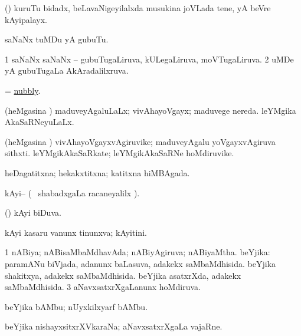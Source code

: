 \bentry
{}
\gl{\nA}
\bmng
(\ame) kuruTu bidadx, beLavaNigeyilalxda musukina joVLada tene, yA beVre kAyipalayx. 
\emng
\eentry

\bentry
{}
\gl{\nA}
\bmng
saNaNx tuMDu yA gubuTu. 
\emng
\eentry

\bentry
{}
\gl{\gu}
\bmng
\bnum
\num{1} saNaNx saNaNx -- gubuTugaLiruva, kULegaLiruva, moVTugaLiruva. 
\num{2} uMDe yA gubuTugaLa AkAradalilxruva. 
\enum
\emng
\eentry

\bentry
{}
\gl{\gu}
\bmng
= \hyperlink{nubbly}{nubbly}. 
\emng
\eentry

\bentry
{}
\gl{\gu}
\bmng
(heMgasina \vi) 
\banum
{} maduveyAgaluLaLx; vivAhayoVgayx; maduvege nereda. 
 leYMgika AkaSaRNeyuLaLx. 
\eanum
\emng
\eentry

\bentry
{}
\gl{\nA}
\bmng
(heMgasina \vi) 
\banum
{} vivAhayoVgayxvAgiruvike; maduveyAgalu yoVgayxvAgiruva sithxti. 
 leYMgikAkaSaRkate; leYMgikAkaSaRNe hoMdiruvike. 
\eanum
\emng
\eentry

\bentry
{}
\gl{\gu}
\bmng
heDagatitxna; hekakxtitxna; katitxna hiMBAgada. 
\emng
\eentry

\bentry
{}
\gl{\sapUpa}
\bmng
kAyi-- ( \mo\ shabadxgaLa racaneyalilx \parx). 
\emng
\eentry

\bentry
{}
\gl{\gu}
\bmng
(\savi) kAyi biDuva. 
\emng
\eentry

\bentry
{}
\gl{\gu}
\bmng
kAyi kasaru \mo vanunx tinunxva; kAyitini. 
\emng
\eentry

\bentry
{}
\gl{\gu}
\bmng
\bnum
\num{1} nABiya; nABisaMbaMdhavAda; nABiyAgiruva; nABiyaMtha. 
 beYjika: 
\banum
{} paramANu biVjada, adanunx baLasuva, adakekx saMbaMdhisida. 
 beYjika shakitxya, adakekx saMbaMdhisida. 
 beYjika asatxrXda, adakekx saMbaMdhisida. 
\eanum
\numie
\num{3} aNavxsatxrXgaLanunx hoMdiruva. 
\enum
\emng
\eentry

\bentry
{}
\gl{\nA}
\bmng
beYjika bAMbu; nUyxkilxyarf bAMbu. 
\emng
\eentry

\bentry
{}
\gl{\nA}
\bmng
beYjika nishayxsitxrXVkaraNa; aNavxsatxrXgaLa vajaRne. 
\emng
\eentry

